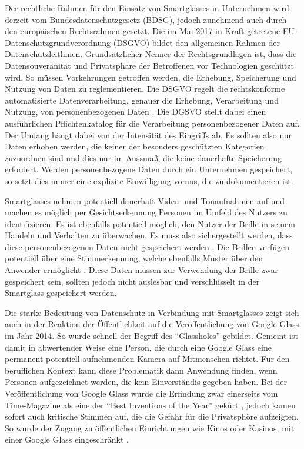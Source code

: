 Der rechtliche Rahmen für den Einsatz von Smartglasses in Unternehmen wird derzeit vom Bundesdatenschutzgesetz (BDSG), jedoch zunehmend auch durch den europäischen Rechtsrahmen gesetzt. Die im Mai 2017 in Kraft getretene EU- Datenschutzgrundverordnung (DSGVO) bildet den allgemeinen Rahmen der Datenschutzleitlinien. Grundsätzlicher Nenner der Rechtsgrundlagen ist, dass die Datensouveränität und Privatsphäre der Betroffenen vor Technologien geschützt wird. So müssen Vorkehrungen getroffen werden, die Erhebung, Speicherung und Nutzung von Daten zu reglementieren.
Die DSGVO regelt die rechtskonforme automatisierte Datenverarbeitung, genauer die Erhebung, Verarbeitung und Nutzung, von personenbezogenen Daten \cite{Berkemeier2017}. Die DGSVO stellt dabei einen ausführlichen  Pflichtenkatalog für die Verarbeitung personenbezogener Daten auf. Der Umfang hängt dabei von der Intensität des Eingriffs ab. Es sollten also nur Daten erhoben werden, die keiner der besonders geschützten Kategorien zuzuordnen sind und dies nur im Aussmaß, die keine dauerhafte Speicherung erfordert. Werden personenbezogene Daten durch ein Unternehmen gespeichert, so setzt dies immer eine explizite Einwilligung voraus, die zu dokumentieren ist.

Smartglasses nehmen potentiell dauerhaft Video- und Tonaufnahmen auf und machen es möglich per Gesichtserkennung Personen im Umfeld des Nutzers zu identifizieren. \cite[S.~38f]{Schwenke2016} Es ist ebenfalls potentiell möglich, den Nutzer der Brille in seinem Handeln und Verhalten zu überwachen. Es muss also sichergestellt werden, dass diese personenbezogenen Daten nicht gespeichert werden \cite[S.~34]{Schwenke2016}. Die Brillen verfügen potentiell über eine Stimmerkennung, welche ebenfalls Muster über den Anwender ermöglicht \cite[S.~41]{Schwenke2016}. Diese Daten müssen zur Verwendung der Brille zwar gespeichert sein, sollten jedoch nicht auslesbar und verschlüsselt in der Smartglass gespeichert werden.

Die starke Bedeutung von Datenschutz in Verbindung mit Smartglasses zeigt sich auch in der Reaktion der Öffentlichkeit auf die Veröffentlichung von Google Glass im Jahr 2014. So wurde schnell der Begriff des \enquote{Glassholes} \cite[S.~14]{ThomasDirkMetzgerHelmutNiegemannHrsg2018} gebildet. Gemeint ist damit in abwertender Weise eine Person, die durch eine Google Glass eine permanent potentiell aufnehmenden Kamera auf Mitmenschen richtet. Für den beruflichen Kontext kann diese Problematik dann Anwendung finden, wenn Personen aufgezeichnet werden, die kein Einverständis gegeben haben. Bei der Veröffentlichung von Google Glass wurde die Erfindung zwar einerseits vom Time-Magazine als eine der \enquote{Best Inventions of the Year} gekürt \cite{Bilton2015}, jedoch kamen sofort auch kritische Stimmen auf, die die Gefahr für die Privatsphöre aufzeigten. So wurde der Zugang zu öffentlichen Einrichtungen wie Kinos oder Kasinos, mit einer Google Glass eingeschränkt \cite[S.~67]{Schwenke2016}. 

